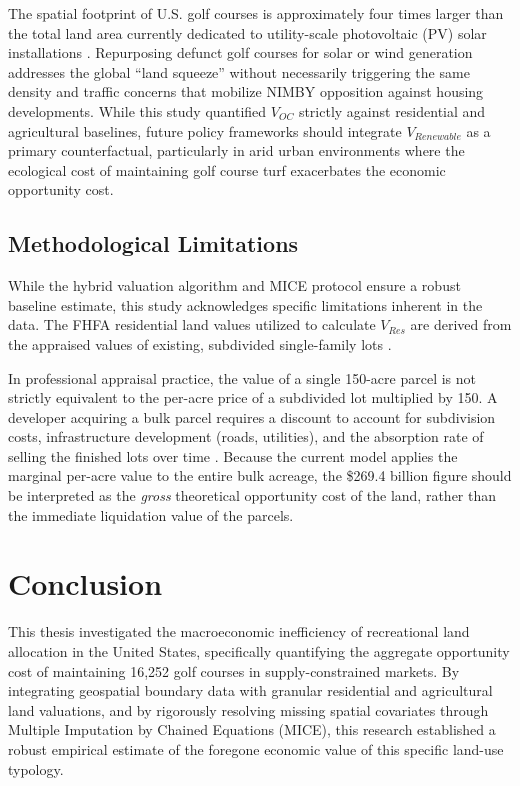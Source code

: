 \documentclass[10pt, letterpaper]{article}
\begin{document}
The spatial footprint of U.S. golf courses is approximately four times larger than the total land area currently dedicated to utility-scale photovoltaic (PV) solar installations \parencite{Weinand2025}. Repurposing defunct golf courses for solar or wind generation addresses the global ``land squeeze'' without necessarily triggering the same density and traffic concerns that mobilize NIMBY opposition against housing developments. While this study quantified $V_{OC}$ strictly against residential and agricultural baselines, future policy frameworks should integrate $V_{Renewable}$ as a primary counterfactual, particularly in arid urban environments where the ecological cost of maintaining golf course turf exacerbates the economic opportunity cost.

\subsection{Methodological Limitations}
While the hybrid valuation algorithm and MICE protocol ensure a robust baseline estimate, this study acknowledges specific limitations inherent in the data. The FHFA residential land values utilized to calculate $V_{Res}$ are derived from the appraised values of existing, subdivided single-family lots \parencite{Davis2021}. 

In professional appraisal practice, the value of a single 150-acre parcel is not strictly equivalent to the per-acre price of a subdivided lot multiplied by 150. A developer acquiring a bulk parcel requires a discount to account for subdivision costs, infrastructure development (roads, utilities), and the absorption rate of selling the finished lots over time \parencite{AppraisalInstitute2020}. Because the current model applies the marginal per-acre value to the entire bulk acreage, the \$269.4 billion figure should be interpreted as the \textit{gross} theoretical opportunity cost of the land, rather than the immediate liquidation value of the parcels.

\newpage

\section{Conclusion}

This thesis investigated the macroeconomic inefficiency of recreational land allocation in the United States, specifically quantifying the aggregate opportunity cost of maintaining 16,252 golf courses in supply-constrained markets. By integrating geospatial boundary data with granular residential and agricultural land valuations, and by rigorously resolving missing spatial covariates through Multiple Imputation by Chained Equations (MICE), this research established a robust empirical estimate of the foregone economic value of this specific land-use typology.
\end{document}
